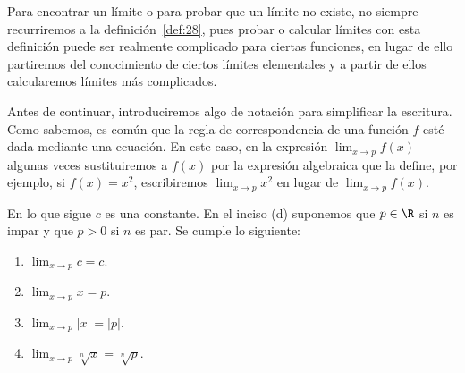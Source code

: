 \documentclass[12pt,a4paper]{book}
\begin{document}
    Para encontrar un límite o para probar que un límite no existe, no siempre
    recurriremos a la definición~\ref{def:28}, pues probar o calcular límites con esta
    definición puede ser realmente complicado para ciertas funciones, en lugar de
    ello partiremos del conocimiento de ciertos límites elementales y a partir de
    ellos calcularemos límites más complicados.

    Antes de continuar, introduciremos algo de notación para simplificar la
    escritura. Como sabemos, es común que la regla de correspondencia de una
    función $f$ esté dada mediante una ecuación. En este caso, en la expresión
    $\lim_{x\to p}f(x)$ algunas veces sustituiremos a $f(x)$ por la expresión algebraica
    que la define, por ejemplo, si $f(x)=x^{2}$, escribiremos $\lim_{x\to p}x^{2}$ en lugar de
    $\lim_{x\to p}f(x)$.

    \begin{proposicion}\label{prop:33}
        En lo que sigue $c$ es una constante. En
        el inciso (d) suponemos que $p\in\R$ si $n$ es impar y que $p>0$ si $n$ es par. Se
        cumple lo siguiente:
        \begin{enumerate}[nosep]
            \item $\displaystyle\lim_{x\to p}c=c$.
            \item $\displaystyle\lim_{x\to p}x=p$.
            \item $\displaystyle\lim_{x\to p}|x|=|p|$.
            \item $\displaystyle\lim_{x\to p}\sqrt[n]{x}=\sqrt[n]{p}$.
        \end{enumerate}
    \end{proposicion}
\end{document}
